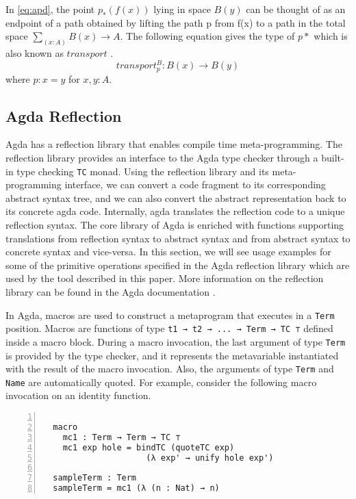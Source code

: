\documentclass[sigplan,10pt]{acmart}
\begin{document}
In \eqref{eq:apd}, the point $p_*(f(x))$ lying in space $B(y)$ can be thought of as an endpoint of a path obtained by lifting the path p from f(x) to a path in the total space $\sum_{(x:A)} B(x) \rightarrow A$. The following equation gives the type of $p*$ which is also known as $transport$ \cite{HoTT-2013}.
\begin{equation} \label{eq:transport}
	transport^B_p : B(x) \rightarrow B(y)
\end{equation}
where $p : x = y$ for $x,y : A$.

\subsection{Agda Reflection}
\label{sec:sec2.2}
Agda has a reflection library that enables compile time meta-programming. The reflection library provides an interface to the Agda type checker through a built-in type checking {\tt TC} monad. Using the reflection library and its meta-programming interface, we can convert a code fragment to its corresponding abstract syntax tree, and we can also convert the abstract representation back to its concrete agda code. Internally, agda translates the reflection code to a unique reflection syntax. The core library of Agda is enriched with functions supporting translations from reflection syntax to abstract syntax and from abstract syntax to concrete syntax and vice-versa. In this section, we will see usage examples for some of the primitive operations specified in the Agda reflection library which are used by the tool described in this paper. More information on the reflection library can be found in the Agda documentation \cite{Agda-doc-2017}.

In Agda, macros are used to construct a metaprogram that executes in a {\tt Term} position. Macros are functions of type {\tt t1 → t2 → ... → Term → TC ⊤} defined inside a macro block. During a macro invocation, the last argument of type {\tt Term} is provided by the type checker, and it represents the metavariable instantiated with the result of the macro invocation. Also, the arguments of type {\tt Term} and {\tt Name} are automatically quoted. For example, consider the following macro invocation on an identity function.

\begin{center}
\begingroup
\fontsize{7pt}{9pt}\selectfont
\begin{Verbatim}[frame = lines, rulecolor=\color{blue}, numbers = left, numbersep = 0pt]

  macro
    mc1 : Term → Term → TC ⊤
    mc1 exp hole = bindTC (quoteTC exp) 
                     (λ exp' → unify hole exp')

  sampleTerm : Term
  sampleTerm = mc1 (λ (n : Nat) → n) 

\end{Verbatim}
\endgroup
\end{center}
\end{document}
